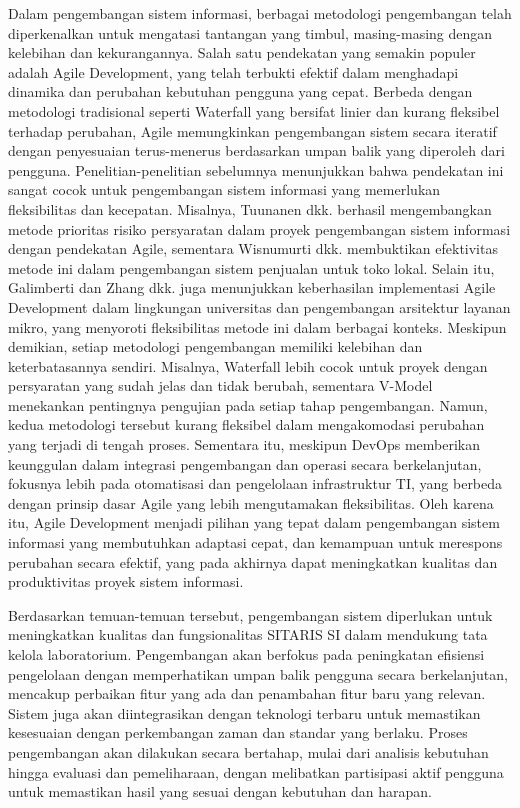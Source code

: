 Dalam pengembangan sistem informasi, berbagai metodologi pengembangan telah diperkenalkan untuk mengatasi tantangan yang timbul, masing-masing dengan kelebihan dan kekurangannya. Salah satu pendekatan yang semakin populer adalah Agile Development, yang telah terbukti efektif dalam menghadapi dinamika dan perubahan kebutuhan pengguna yang cepat. Berbeda dengan metodologi tradisional seperti Waterfall yang bersifat linier dan kurang fleksibel terhadap perubahan, Agile memungkinkan pengembangan sistem secara iteratif dengan penyesuaian terus-menerus berdasarkan umpan balik yang diperoleh dari pengguna. Penelitian-penelitian sebelumnya menunjukkan bahwa pendekatan ini sangat cocok untuk pengembangan sistem informasi yang memerlukan fleksibilitas dan kecepatan. Misalnya, Tuunanen dkk. \citeyear{tuunanen2023development} berhasil mengembangkan metode prioritas risiko persyaratan dalam proyek pengembangan sistem informasi dengan pendekatan Agile, sementara Wisnumurti dkk. \citeyear{wisnumurti2022penerapan} membuktikan efektivitas metode ini dalam pengembangan sistem penjualan untuk toko lokal. Selain itu, Galimberti \citeyear{trelles2021agile} dan Zhang dkk. \citeyear{zhang2024establishment} juga menunjukkan keberhasilan implementasi Agile Development dalam lingkungan universitas dan pengembangan arsitektur layanan mikro, yang menyoroti fleksibilitas metode ini dalam berbagai konteks. Meskipun demikian, setiap metodologi pengembangan memiliki kelebihan dan keterbatasannya sendiri. Misalnya, Waterfall lebih cocok untuk proyek dengan persyaratan yang sudah jelas dan tidak berubah, sementara V-Model menekankan pentingnya pengujian pada setiap tahap pengembangan. Namun, kedua metodologi tersebut kurang fleksibel dalam mengakomodasi perubahan yang terjadi di tengah proses. Sementara itu, meskipun DevOps memberikan keunggulan dalam integrasi pengembangan dan operasi secara berkelanjutan, fokusnya lebih pada otomatisasi dan pengelolaan infrastruktur TI, yang berbeda dengan prinsip dasar Agile yang lebih mengutamakan fleksibilitas. Oleh karena itu, Agile Development menjadi pilihan yang tepat dalam pengembangan sistem informasi yang membutuhkan adaptasi cepat, dan kemampuan untuk merespons perubahan secara efektif, yang pada akhirnya dapat meningkatkan kualitas dan produktivitas proyek sistem informasi.

Berdasarkan temuan-temuan tersebut, pengembangan sistem diperlukan untuk meningkatkan kualitas dan fungsionalitas SITARIS SI dalam mendukung tata kelola laboratorium. Pengembangan akan berfokus pada peningkatan efisiensi pengelolaan dengan memperhatikan umpan balik pengguna secara berkelanjutan, mencakup perbaikan fitur yang ada dan penambahan fitur baru yang relevan. Sistem juga akan diintegrasikan dengan teknologi terbaru untuk memastikan kesesuaian dengan perkembangan zaman dan standar yang berlaku. Proses pengembangan akan dilakukan secara bertahap, mulai dari analisis kebutuhan hingga evaluasi dan pemeliharaan, dengan melibatkan partisipasi aktif pengguna untuk memastikan hasil yang sesuai dengan kebutuhan dan harapan.

